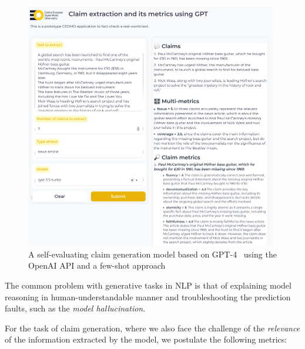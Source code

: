 \begin{figure}
    \includegraphics[width=11cm]{fig/gptext.pdf}
    \caption{A self-evaluating claim generation model based on GPT-4~\cite{gpt4} using the \textsf{OpenAI API} and a few-shot approach}
    \label{fig:gptext}
\end{figure}
\label{sec:metrics}
The common problem with generative tasks in NLP is that of explaining model reasoning in human-understandable manner and troubleshooting the prediction faults, such as the \textit{model hallucination}.

For the task of claim generation, where we also face the challenge of the \textit{relevance} of the information extracted by the model, we postulate the following metrics:


